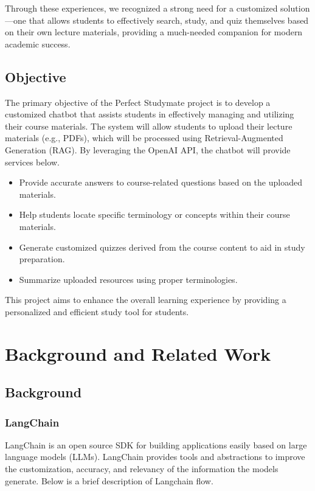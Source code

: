 \documentclass[runningheads]{llncs}
\begin{document}
\begin{spacing}{1.25}
Through these experiences, we recognized a strong need for a customized solution—one that allows students to effectively search, study, and quiz themselves based on their own lecture materials, providing a much-needed companion for modern academic success.


\subsection{Objective}
The primary objective of the Perfect Studymate project is to develop a customized chatbot that assists students in effectively managing and utilizing their course materials. The system will allow students to upload their lecture materials (e.g., PDFs), which will be processed using Retrieval-Augmented Generation (RAG). By leveraging the OpenAI API, the chatbot will provide services below.

\begin{itemize}
  \item Provide accurate answers to course-related questions based on the uploaded materials.
  \item Help students locate specific terminology or concepts within their course materials.
  \item Generate customized quizzes derived from the course content to aid in study preparation.
  \item Summarize uploaded resources using proper terminologies.
\end{itemize}

This project aims to enhance the overall learning experience by providing a personalized and efficient study tool for students.


\section{Background and Related Work}

\subsection{Background}
\subsubsection{LangChain} LangChain is an open source SDK for building applications easily based on large language models (LLMs). LangChain provides tools and abstractions to improve the customization, accuracy, and relevancy of the information the models generate. Below is a brief description of Langchain flow.


\end{spacing}
\end{document}
